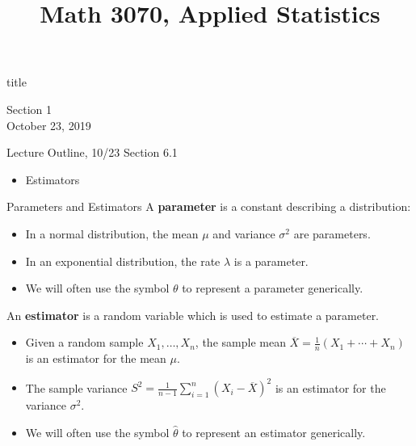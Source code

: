 \documentclass[t,handout]{beamer}
\title{Math 3070, Applied Statistics}
\newcommand{\nl}[1]{\vspace{#1 em}}
\begin{document}
\begin{frame}[c]
    \begin{beamercolorbox}[rounded=true,wd=\textwidth,center]{title}
        \inserttitle
    \end{beamercolorbox}
    \begin{center}
        Section 1\\
        \nl{0.5}
        October 23, 2019
    \end{center}
\end{frame}
\begin{frame}[c]{Lecture Outline, 10/23}
    Section 6.1
    \begin{itemize}
        \item Estimators
    \end{itemize}
\end{frame}
\begin{frame}{Parameters and Estimators}
    A \textbf{parameter} is a constant describing a distribution:
    \begin{itemize}
    \item In a normal distribution, the mean $\mu$ and variance $\sigma^2$ are parameters.
    \pause\item In an exponential distribution, the rate $\lambda$ is a parameter.
    \pause\item We will often use the symbol $\theta$ to represent a parameter generically.
    \end{itemize}
    
    \pause An \textbf{estimator} is a random variable which is used to estimate a parameter.
    \begin{itemize}
    \pause\item Given a random sample $X_1,\dots,X_n$, the sample mean $\overline{X} = \frac1n(X_1+\cdots+X_n)$ is an estimator for the mean $\mu$.
    \pause\item The sample variance $S^2 = \frac1{n-1}\sum_{i=1}^n (X_i-\overline{X})^2$ is an estimator for the variance $\sigma^2$.
    \pause\item We will often use the symbol $\hat\theta$ to represent an estimator generically.
    \end{itemize}
    \end{frame}
\end{document}
